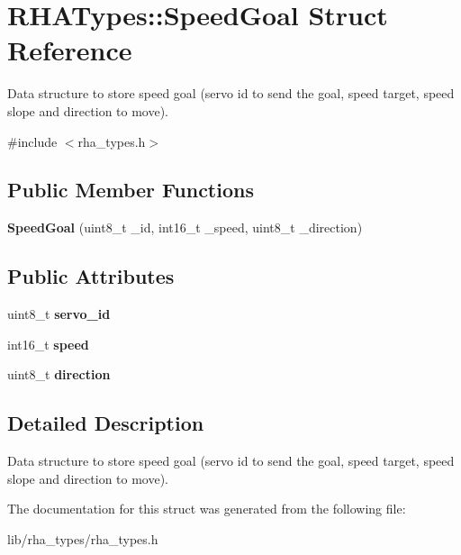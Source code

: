 \hypertarget{structRHATypes_1_1SpeedGoal}{}\section{R\+H\+A\+Types\+:\+:Speed\+Goal Struct Reference}
\label{structRHATypes_1_1SpeedGoal}


Data structure to store speed goal (servo id to send the goal, speed target, speed slope and direction to move).  




{\ttfamily \#include $<$rha\+\_\+types.\+h$>$}

\subsection*{Public Member Functions}
\begin{DoxyCompactItemize}
\item 
{\bfseries Speed\+Goal} (uint8\+\_\+t \+\_\+id, int16\+\_\+t \+\_\+speed, uint8\+\_\+t \+\_\+direction)\hypertarget{structRHATypes_1_1SpeedGoal_a85ba3d3b5c7c4021dc1855d5d7e6b362}{}\label{structRHATypes_1_1SpeedGoal_a85ba3d3b5c7c4021dc1855d5d7e6b362}

\end{DoxyCompactItemize}
\subsection*{Public Attributes}
\begin{DoxyCompactItemize}
\item 
uint8\+\_\+t {\bfseries servo\+\_\+id}\hypertarget{structRHATypes_1_1SpeedGoal_ab22896bc22274b1f493697e15813945b}{}\label{structRHATypes_1_1SpeedGoal_ab22896bc22274b1f493697e15813945b}

\item 
int16\+\_\+t {\bfseries speed}\hypertarget{structRHATypes_1_1SpeedGoal_ab518696fee2f12aa654e596d11d0282d}{}\label{structRHATypes_1_1SpeedGoal_ab518696fee2f12aa654e596d11d0282d}

\item 
uint8\+\_\+t {\bfseries direction}\hypertarget{structRHATypes_1_1SpeedGoal_ac6caa9c724c00e100f6b017d2b35c9f4}{}\label{structRHATypes_1_1SpeedGoal_ac6caa9c724c00e100f6b017d2b35c9f4}

\end{DoxyCompactItemize}


\subsection{Detailed Description}
Data structure to store speed goal (servo id to send the goal, speed target, speed slope and direction to move). 

The documentation for this struct was generated from the following file\+:\begin{DoxyCompactItemize}
\item 
lib/rha\+\_\+types/rha\+\_\+types.\+h\end{DoxyCompactItemize}
